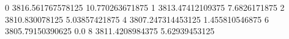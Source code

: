 0 3816.561767578125 10.770263671875
1 3813.47412109375 7.6826171875
2 3810.830078125 5.03857421875
4 3807.247314453125 1.455810546875
6 3805.79150390625 0.0
8 3811.4208984375 5.62939453125
